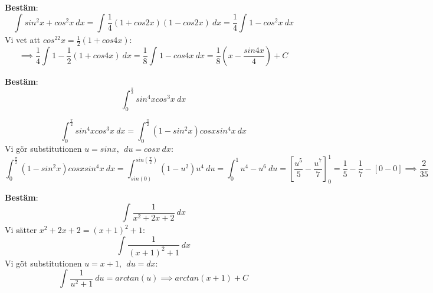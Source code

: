 \documentclass{report}
\begin{document}
\pagebreak
{}
{
\textbf{Bestäm}:
\begin{equation*}
\int_{}^{} sin^2x+cos^2x \: dx = \int_{}^{} \frac{1}{4} (1+cos2x)(1-cos2x) \: dx = \frac{1}{4} \int_{}^{} 1-cos^2x \: dx   
\end{equation*}
Vi vet att $ cos^22x = \frac{1}{2} (1+cos4x) $:
\begin{equation*}
\implies \frac{1}{4} \int_{}^{} 1- \frac{1}{2} (1+ cos4x) \: dx = \frac{1}{8} \int_{}^{} 1 - cos4x \: dx = \frac{1}{8} (x - \frac{sin4x}{4} ) + C  
\end{equation*}
}

\qs{}
{
\textbf{Bestäm}:
\begin{equation*}
\int_{0}^{ \frac{\pi}{2} } sin^4xcos^3x \: dx
\end{equation*}
}

\sol
\begin{equation*}
\int_{0}^{ \frac{\pi}{2} } sin^4xcos^3x \: dx = \int_{0}^{ \frac{\pi}{2} } (1-sin^2x)cosx sin^4x \: dx  
\end{equation*}
Vi gör substitutionen $ u = sinx,\:\: du = cosx\:dx $:
\begin{equation*}
	\int_{0}^{ \frac{\pi}{2} } (1-sin^2x)cosxsin^4x \: dx = \int_{sin(0)}^{sin( \frac{\pi}{2} )} (1-u^2)u^4 \: du = \int_{0}^{1} u^4 - u^6 \: du = [\frac{u^5}{5} - \frac{u^7}{7}]_{0}^{1} = \frac{1}{5} - \frac{1}{7} - [0 - 0] \implies \frac{2}{35}     
\end{equation*}

\vspace{20pt}
\qs{}
{
\textbf{Bestäm}:
\begin{equation*}
\int_{}^{} \frac{1}{x^2+2x+2}  \: dx 
\end{equation*}
}
\sol Vi sätter $ x^2+2x+2 = (x+1)^2+1 $:
\begin{equation*}
\int_{}^{} \frac{1}{(x+1)^2+1}  \: dx 
\end{equation*}
Vi göt substitutionen $ u = x+1,\:\: du = dx $:
\begin{equation*}
\int_{}^{} \frac{1}{u^2+1}  \: du = arctan(u) \implies arctan(x+1) +C 
\end{equation*}
\end{document}
